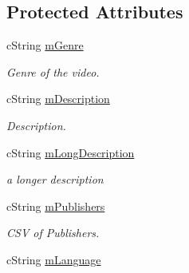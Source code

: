 \subsection*{Protected Attributes}
\begin{CompactItemize}
\item 
\hypertarget{classcUPnPClassVideoItem_b7fa79ab14701142597088b0a73515c3}{
cString \hyperlink{classcUPnPClassVideoItem_b7fa79ab14701142597088b0a73515c3}{mGenre}}
\label{classcUPnPClassVideoItem_b7fa79ab14701142597088b0a73515c3}

\begin{CompactList}\small\item\em Genre of the video. \item\end{CompactList}\item 
\hypertarget{classcUPnPClassVideoItem_bdf0f85f02d43ef32d8aab1daecddd7e}{
cString \hyperlink{classcUPnPClassVideoItem_bdf0f85f02d43ef32d8aab1daecddd7e}{mDescription}}
\label{classcUPnPClassVideoItem_bdf0f85f02d43ef32d8aab1daecddd7e}

\begin{CompactList}\small\item\em Description. \item\end{CompactList}\item 
\hypertarget{classcUPnPClassVideoItem_577abd61e96e6a7a17acd48eb7854a59}{
cString \hyperlink{classcUPnPClassVideoItem_577abd61e96e6a7a17acd48eb7854a59}{mLongDescription}}
\label{classcUPnPClassVideoItem_577abd61e96e6a7a17acd48eb7854a59}

\begin{CompactList}\small\item\em a longer description \item\end{CompactList}\item 
\hypertarget{classcUPnPClassVideoItem_f6bcbeb08f86a8e8c133e0904c07e89e}{
cString \hyperlink{classcUPnPClassVideoItem_f6bcbeb08f86a8e8c133e0904c07e89e}{mPublishers}}
\label{classcUPnPClassVideoItem_f6bcbeb08f86a8e8c133e0904c07e89e}

\begin{CompactList}\small\item\em CSV of Publishers. \item\end{CompactList}\item 
\hypertarget{classcUPnPClassVideoItem_9d1d5e4f5058e4ca6a9e011b6eb97471}{
cString \hyperlink{classcUPnPClassVideoItem_9d1d5e4f5058e4ca6a9e011b6eb97471}{mLanguage}}
\label{classcUPnPClassVideoItem_9d1d5e4f5058e4ca6a9e011b6eb97471}


\end{CompactItemize}
